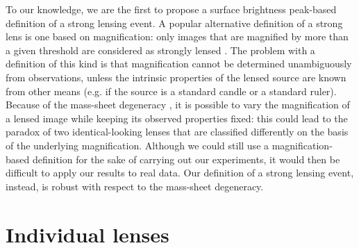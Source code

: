 \documentclass{aa}
\begin{document}
To our knowledge, we are the first to propose a surface brightness peak-based definition of a strong lensing event.
A popular alternative definition of a strong lens is one based on magnification: only images that are magnified by more than a given threshold are considered as strongly lensed \citep[see e.g.][]{Hil++07}.
The problem with a definition of this kind is that magnification cannot be determined unambiguously from observations, unless the intrinsic properties of the lensed source are known from other means (e.g. if the source is a standard candle or a standard ruler).
Because of the mass-sheet degeneracy \citep{FGS85}, it is possible to vary the magnification of a lensed image while keeping its observed properties fixed: this could lead to the paradox of two identical-looking lenses that are classified differently on the basis of the underlying magnification.
Although we could still use a magnification-based definition for the sake of carrying out our experiments, it would then be difficult to apply our results to real data.
Our definition of a strong lensing event, instead, is robust with respect to the mass-sheet degeneracy.


\section{Individual lenses}\label{sect:indlenses}
\end{document}
